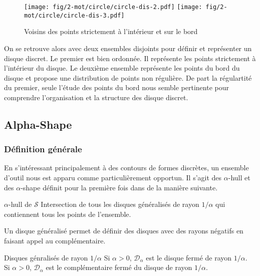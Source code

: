 \begin{figure}[H]
  \centering
  \texttt{[image: fig/2-mot/circle/circle-dis-2.pdf]}
  \texttt{[image: fig/2-mot/circle/circle-dis-3.pdf]}
  \caption{Voisins des points strictement à l'intérieur et sur le bord }
\end{figure}

On se retrouve alors avec deux ensembles disjoints pour définir et représenter un disque discret. Le premier est bien ordonnée. Il représente les points strictement à l'intérieur du disque. Le deuxième ensemble représente les points du bord du disque et propose une distribution de points non régulière. De part la régulartité du premier, seule l'étude des points du bord nous semble pertinente pour comprendre l'organisation et la structure des disque discret.


\subsection{Alpha-Shape}

\subsubsection{Définition générale}

En s'intéressant principalement à des contours de formes discrètes, un ensemble d'outil nous est apparu comme particulièrement opportun. Il s'agit des $\alpha$-hull et des $\alpha$-shape définit pour la première fois dans \cite{EdeKirSei83} de la manière suivante.\\



\begin{Definition}{$\alpha$-hull de $\mathcal{S}$}
\label{def:ah-txt}
    Intersection de tous les disques généralisés de rayon $1/\alpha$ qui contiennent tous les points de l'ensemble.
\end{Definition}

Un disque généralisé permet de définir des disques avec des rayons négatifs en faisant appel au complémentaire.

\begin{Definition}{Disques génralisés de rayon $1/\alpha$}
\label{def:ah-txt}
   Si $\alpha > 0$, $\mathcal{D}_{\alpha}$ est le disque fermé de rayon $1/\alpha$.\\
   Si $\alpha > 0$, $\mathcal{D}_{\alpha}$ est le complémentaire fermé du disque de rayon $1/\alpha$.
\end{Definition}

